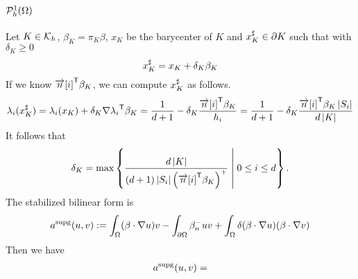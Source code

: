 %
\subsection{$\mathcal{P}^1_h(\Omega)$}\label{subsec:}
%
%
Let $K\in\mathcal K_h$, $\beta_K=\pi_K\beta$, $x_K$ be the barycenter of $K$ and $x_{K}^{\sharp}\in\partial K$ such that  with 
$\delta_K\ge0$
%
\begin{equation}\label{eq:}
x_{K}^{\sharp} = x_K + \delta_K \beta_K
\end{equation}
%
If we know ${\mathbf{\overrightarrow{n}}[i]}^{\mathsf{T}}\beta_K$, we can compute $x_{K}^{\sharp}$ as follows.
%
\begin{align*}
\lambda_i(x_{K}^{\sharp}) = \lambda_i(x_K) + \delta_K {\nabla\lambda_i}^{\mathsf{T}}\beta_K
= \frac{1}{d+1} - \delta_K \frac{{\mathbf{\overrightarrow{n}}[i]}^{\mathsf{T}}\beta_K}{h_i}
= \frac{1}{d+1} - \delta_K \frac{{\mathbf{\overrightarrow{n}}[i]}^{\mathsf{T}}\beta_K \left|S_i\right|}{d\left|K\right|}
\end{align*}
%
It follows that
%
\begin{equation}\label{eq:}
\delta_K = \max\left\{\frac{d\left|K\right|}{(d+1)\left|S_i\right|\left({\mathbf{\overrightarrow{n}}[i]}^{\mathsf{T}}\beta_K\right)^+}\;\middle|\;0\le i\le d\right\}.
\end{equation}
%
The stabilized bilinear form is
%
\begin{equation}\label{eq:}
a^{\rm supg}(u,v) := \int_{\Omega} (\beta\cdot \nabla  u) v - \int_{\partial\Omega} \beta_n^- uv + \int_{\Omega} \delta(\beta\cdot \nabla u)( \beta\cdot \nabla v)
\end{equation}
%
Then we have
%
\begin{align*}
a^{\rm supg}(u,v) = 
\end{align*}
%



\printbibliography[title=References Section~\thesection]

